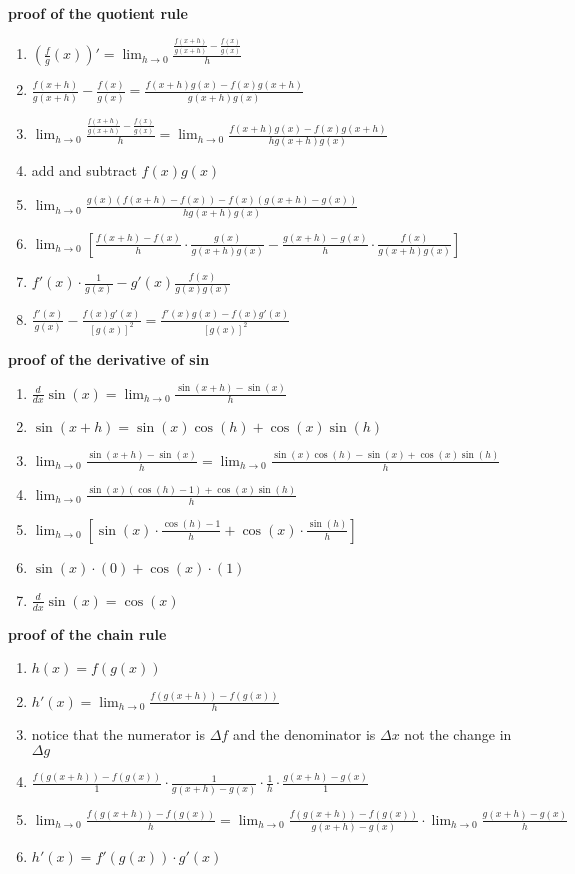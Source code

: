 \documentclass{article}
\begin{document}
\textbf{proof of the quotient rule}
	\begin{enumerate}
		\item $(\frac{f}{g}(x))' = \lim_{h \to 0}\frac{\frac{f(x + h)}{g(x + h)} - \frac{f(x)}{g(x)}}{h}$	
		\item $\frac{f(x + h)}{g(x + h)} - \frac{f(x)}{g(x)} = \frac{f(x + h)g(x) - f(x)g(x + h)}{g(x + h)g(x)}$
		\item $\lim_{h \to 0}\frac{\frac{f(x + h)}{g(x + h)} - \frac{f(x)}{g(x)}}{h} = \lim_{h \to 0}\frac{f(x + h)g(x) - f(x)g(x + h)}{hg(x + h)g(x)}$
		\item add and subtract $f(x)g(x)$
		\item $\lim_{h \to 0}\frac{g(x)(f(x + h) - f(x)) - f(x)(g(x + h) - g(x))}{hg(x + h)g(x)}$
		\item $\lim_{h \to 0}[\frac{f(x + h) - f(x)}{h} \cdot \frac{g(x)}{g(x + h)g(x)} - \frac{g(x + h) - g(x)}{h} \cdot \frac{f(x)}{g(x + h)g(x)}]$
		\item $f'(x) \cdot \frac{1}{g(x)} - g'(x)\frac{f(x)}{g(x)g(x)}$
		\item $\frac{f'(x)}{g(x)} - \frac{f(x)g'(x)}{[g(x)]^2} = \frac{f'(x)g(x) - f(x)g'(x)}{[g(x)]^2}$
	\end{enumerate}

\textbf{proof of the derivative of sin}
	\begin{enumerate}
		\item $\frac{d}{dx}\sin(x) = \lim_{h \to 0}\frac{\sin(x + h) - \sin(x)}{h}$
		\item $\sin(x + h) = \sin(x)\cos(h) + \cos(x)\sin(h)$
		\item $\lim_{h \to 0}\frac{\sin(x + h) - \sin(x)}{h} = \lim_{h \to 0}\frac{\sin(x)\cos(h) - \sin(x) + \cos(x)\sin(h)}{h}$
		\item $\lim_{h \to 0}\frac{\sin(x)(\cos(h) - 1) + \cos(x)\sin(h)}{h}$
		\item $\lim_{h \to 0}[\sin(x) \cdot \frac{\cos(h) - 1}{h} + \cos(x) \cdot \frac{\sin(h)}{h}]$
		\item $\sin(x) \cdot (0) + \cos(x) \cdot (1)$
		\item $\frac{d}{dx}\sin(x) = \cos(x)$
	\end{enumerate}

\textbf{proof of the chain rule}
	\begin{enumerate}
		\item $h(x) = f(g(x))$ 
		\item $h'(x) = \lim_{h \to 0}\frac{f(g(x + h)) - f(g(x))}{h}$
		\item notice that the numerator is $\Delta f$ and the denominator is $\Delta x$ not the change in $\Delta g$
		\item $\frac{f(g(x + h)) - f(g(x))}{1} \cdot \frac{1}{g(x + h) - g(x)} \cdot \frac{1}{h} \cdot \frac{g(x + h) - g(x)}{1}$
		\item $\lim_{h \to 0}\frac{f(g(x + h)) - f(g(x))}{h} = \lim_{h \to 0}\frac{f(g(x + h)) - f(g(x))}{g(x + h) - g(x)} \cdot \lim_{h \to 0}\frac{g(x + h) - g(x)}{h}$
		\item $h'(x) = f'(g(x)) \cdot g'(x)$
	\end{enumerate}
\end{document}
